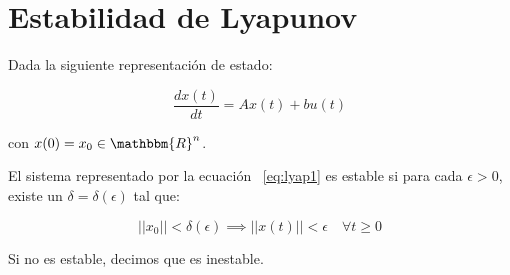 
\chapter{Estabilidad de Lyapunov}

    Dada la siguiente representación de estado:

    \begin{equation} \label{eq:lyap1}
        \frac{dx(t)}{dt} = A x(t) + b u(t)
    \end{equation}

    con $x(0) = x_0  \in \mathbbm{R}^n$.

    \begin{definicion}
        El sistema representado por la ecuación ~\ref{eq:lyap1} es estable si para cada $\epsilon > 0$, existe un $\delta = \delta(\epsilon)$ tal que:

        \begin{equation*}
            ||x_0|| < \delta(\epsilon) \implies  ||x(t)||  < \epsilon \quad \forall t \ge 0
        \end{equation*}

        Si no es estable, decimos que es inestable.

    \end{definicion}

